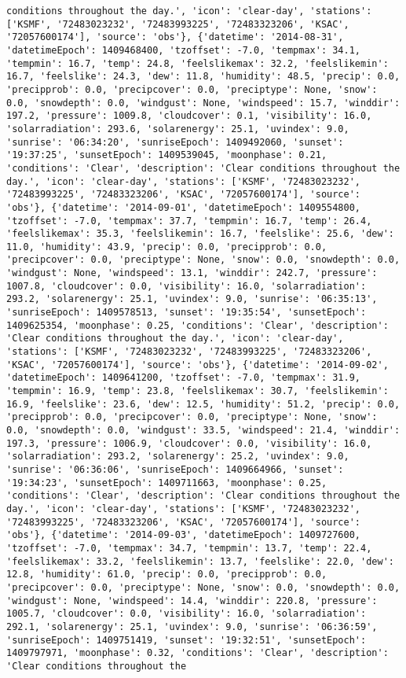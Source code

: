 \documentclass[
  letterpaper,
  DIV=11,
  numbers=noendperiod]{scrartcl}
\begin{document}
\begin{verbatim}
conditions throughout the day.', 'icon': 'clear-day', 'stations': ['KSMF', '72483023232', '72483993225', '72483323206', 'KSAC', '72057600174'], 'source': 'obs'}, {'datetime': '2014-08-31', 'datetimeEpoch': 1409468400, 'tzoffset': -7.0, 'tempmax': 34.1, 'tempmin': 16.7, 'temp': 24.8, 'feelslikemax': 32.2, 'feelslikemin': 16.7, 'feelslike': 24.3, 'dew': 11.8, 'humidity': 48.5, 'precip': 0.0, 'precipprob': 0.0, 'precipcover': 0.0, 'preciptype': None, 'snow': 0.0, 'snowdepth': 0.0, 'windgust': None, 'windspeed': 15.7, 'winddir': 197.2, 'pressure': 1009.8, 'cloudcover': 0.1, 'visibility': 16.0, 'solarradiation': 293.6, 'solarenergy': 25.1, 'uvindex': 9.0, 'sunrise': '06:34:20', 'sunriseEpoch': 1409492060, 'sunset': '19:37:25', 'sunsetEpoch': 1409539045, 'moonphase': 0.21, 'conditions': 'Clear', 'description': 'Clear conditions throughout the day.', 'icon': 'clear-day', 'stations': ['KSMF', '72483023232', '72483993225', '72483323206', 'KSAC', '72057600174'], 'source': 'obs'}, {'datetime': '2014-09-01', 'datetimeEpoch': 1409554800, 'tzoffset': -7.0, 'tempmax': 37.7, 'tempmin': 16.7, 'temp': 26.4, 'feelslikemax': 35.3, 'feelslikemin': 16.7, 'feelslike': 25.6, 'dew': 11.0, 'humidity': 43.9, 'precip': 0.0, 'precipprob': 0.0, 'precipcover': 0.0, 'preciptype': None, 'snow': 0.0, 'snowdepth': 0.0, 'windgust': None, 'windspeed': 13.1, 'winddir': 242.7, 'pressure': 1007.8, 'cloudcover': 0.0, 'visibility': 16.0, 'solarradiation': 293.2, 'solarenergy': 25.1, 'uvindex': 9.0, 'sunrise': '06:35:13', 'sunriseEpoch': 1409578513, 'sunset': '19:35:54', 'sunsetEpoch': 1409625354, 'moonphase': 0.25, 'conditions': 'Clear', 'description': 'Clear conditions throughout the day.', 'icon': 'clear-day', 'stations': ['KSMF', '72483023232', '72483993225', '72483323206', 'KSAC', '72057600174'], 'source': 'obs'}, {'datetime': '2014-09-02', 'datetimeEpoch': 1409641200, 'tzoffset': -7.0, 'tempmax': 31.9, 'tempmin': 16.9, 'temp': 23.8, 'feelslikemax': 30.7, 'feelslikemin': 16.9, 'feelslike': 23.6, 'dew': 12.5, 'humidity': 51.2, 'precip': 0.0, 'precipprob': 0.0, 'precipcover': 0.0, 'preciptype': None, 'snow': 0.0, 'snowdepth': 0.0, 'windgust': 33.5, 'windspeed': 21.4, 'winddir': 197.3, 'pressure': 1006.9, 'cloudcover': 0.0, 'visibility': 16.0, 'solarradiation': 293.2, 'solarenergy': 25.2, 'uvindex': 9.0, 'sunrise': '06:36:06', 'sunriseEpoch': 1409664966, 'sunset': '19:34:23', 'sunsetEpoch': 1409711663, 'moonphase': 0.25, 'conditions': 'Clear', 'description': 'Clear conditions throughout the day.', 'icon': 'clear-day', 'stations': ['KSMF', '72483023232', '72483993225', '72483323206', 'KSAC', '72057600174'], 'source': 'obs'}, {'datetime': '2014-09-03', 'datetimeEpoch': 1409727600, 'tzoffset': -7.0, 'tempmax': 34.7, 'tempmin': 13.7, 'temp': 22.4, 'feelslikemax': 33.2, 'feelslikemin': 13.7, 'feelslike': 22.0, 'dew': 12.8, 'humidity': 61.0, 'precip': 0.0, 'precipprob': 0.0, 'precipcover': 0.0, 'preciptype': None, 'snow': 0.0, 'snowdepth': 0.0, 'windgust': None, 'windspeed': 14.4, 'winddir': 220.8, 'pressure': 1005.7, 'cloudcover': 0.0, 'visibility': 16.0, 'solarradiation': 292.1, 'solarenergy': 25.1, 'uvindex': 9.0, 'sunrise': '06:36:59', 'sunriseEpoch': 1409751419, 'sunset': '19:32:51', 'sunsetEpoch': 1409797971, 'moonphase': 0.32, 'conditions': 'Clear', 'description': 'Clear conditions throughout the 
\end{verbatim}
\end{document}
